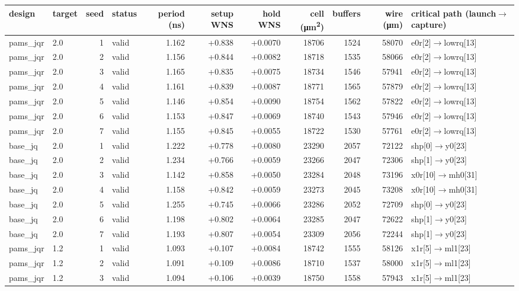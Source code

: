 \begin{tabular}{@{}llrlrrrrrrl@{}}
\toprule
design & target & seed & status & period (ns) & setup WNS & hold WNS & cell (\si{\micro\meter\squared}) & buffers & wire (\si{\micro\meter}) & critical path (launch$\to$capture) \\
\midrule
pams\_jqr & 2.0 & 1 & valid & 1.162 & +0.838 & +0.0070 & 18706 & 1524 & 58070 & e0r[2]$\to$lowrq[13] \\
pams\_jqr & 2.0 & 2 & valid & 1.156 & +0.844 & +0.0082 & 18718 & 1535 & 58066 & e0r[2]$\to$lowrq[13] \\
pams\_jqr & 2.0 & 3 & valid & 1.165 & +0.835 & +0.0075 & 18734 & 1546 & 57941 & e0r[2]$\to$lowrq[13] \\
pams\_jqr & 2.0 & 4 & valid & 1.161 & +0.839 & +0.0087 & 18771 & 1565 & 57879 & e0r[2]$\to$lowrq[13] \\
pams\_jqr & 2.0 & 5 & valid & 1.146 & +0.854 & +0.0090 & 18754 & 1562 & 57822 & e0r[2]$\to$lowrq[13] \\
pams\_jqr & 2.0 & 6 & valid & 1.153 & +0.847 & +0.0069 & 18740 & 1543 & 57946 & e0r[2]$\to$lowrq[13] \\
pams\_jqr & 2.0 & 7 & valid & 1.155 & +0.845 & +0.0055 & 18722 & 1530 & 57761 & e0r[2]$\to$lowrq[13] \\
base\_jq & 2.0 & 1 & valid & 1.222 & +0.778 & +0.0080 & 23290 & 2057 & 72122 & shp[0]$\to$y0[23] \\
base\_jq & 2.0 & 2 & valid & 1.234 & +0.766 & +0.0059 & 23266 & 2047 & 72306 & shp[1]$\to$y0[23] \\
base\_jq & 2.0 & 3 & valid & 1.142 & +0.858 & +0.0050 & 23284 & 2048 & 73196 & x0r[10]$\to$mh0[31] \\
base\_jq & 2.0 & 4 & valid & 1.158 & +0.842 & +0.0059 & 23273 & 2045 & 73208 & x0r[10]$\to$mh0[31] \\
base\_jq & 2.0 & 5 & valid & 1.255 & +0.745 & +0.0066 & 23286 & 2052 & 72709 & shp[0]$\to$y0[23] \\
base\_jq & 2.0 & 6 & valid & 1.198 & +0.802 & +0.0064 & 23285 & 2047 & 72622 & shp[1]$\to$y0[23] \\
base\_jq & 2.0 & 7 & valid & 1.193 & +0.807 & +0.0054 & 23309 & 2056 & 72244 & shp[1]$\to$y0[23] \\
pams\_jqr & 1.2 & 1 & valid & 1.093 & +0.107 & +0.0084 & 18742 & 1555 & 58126 & x1r[5]$\to$ml1[23] \\
pams\_jqr & 1.2 & 2 & valid & 1.091 & +0.109 & +0.0086 & 18710 & 1537 & 58000 & x1r[5]$\to$ml1[23] \\
pams\_jqr & 1.2 & 3 & valid & 1.094 & +0.106 & +0.0039 & 18750 & 1558 & 57943 & x1r[5]$\to$ml1[23] \\

\end{tabular}
